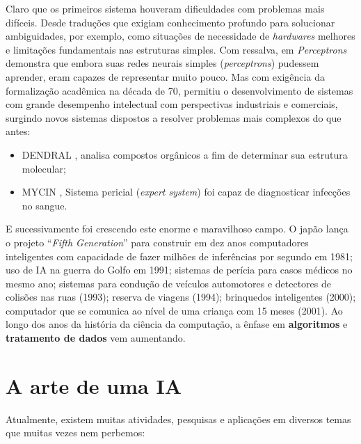 \documentclass[
  openany]{book}
\begin{document}
Claro que os primeiros sistema houveram dificuldades com problemas mais difíceis. Desde traduções que exigiam conhecimento profundo para solucionar ambiguidades, por exemplo, como situações de necessidade de \emph{hardwares} melhores e limitações fundamentais nas estruturas simples. Com ressalva, em \emph{Perceptrons} \citep{minsky1969perceptrons} demonstra que embora suas redes neurais simples (\emph{perceptrons}) pudessem aprender, eram capazes de representar muito pouco. Mas com exigência da formalização acadêmica na década de 70, permitiu o desenvolvimento de sistemas com grande desempenho intelectual com perspectivas industriais e comerciais, surgindo novos sistemas dispostos a resolver problemas mais complexos do que antes:

\begin{itemize}
\item
  DENDRAL \citep{buchanan1969heuristic}, analisa compostos orgânicos a fim de determinar sua estrutura molecular;
\item
  MYCIN \citep{buchanan1984rule}, Sistema pericial (\emph{expert system}) foi capaz de diagnosticar infecções no sangue.
\end{itemize}

E sucessivamente foi crescendo este enorme e maravilhoso campo. O japão lança o projeto ``\emph{Fifth Generation}'' para construir em dez anos computadores inteligentes com capacidade de fazer milhões de inferências por segundo em 1981; uso de IA na guerra do Golfo em 1991; sistemas de perícia para casos médicos no mesmo ano; sistemas para condução de veículos automotores e detectores de colisões nas ruas (1993); reserva de viagens (1994); brinquedos inteligentes (2000); computador que se comunica ao nível de uma criança com 15 meses (2001). Ao longo dos anos da história da ciência da computação, a ênfase em \textbf{algoritmos} e \textbf{tratamento de dados} vem aumentando.

\hypertarget{a-arte-de-uma-ia}{%
\section{A arte de uma IA}\label{a-arte-de-uma-ia}}

Atualmente, existem muitas atividades, pesquisas e aplicações em diversos temas que muitas vezes nem perbemos:
\end{document}
